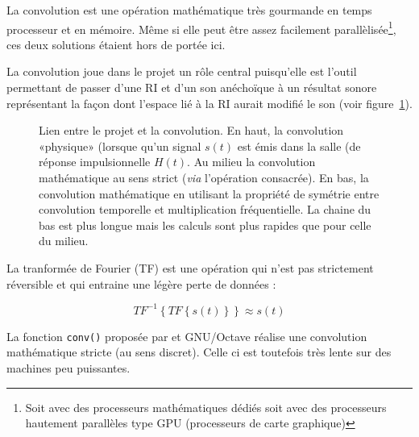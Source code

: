 La convolution est une opération mathématique très gourmande en temps processeur et en mémoire. Même si elle peut être
assez facilement parallèlisée\footnote{Soit avec des processeurs mathématiques dédiés soit avec des processeurs
hautement parallèles type GPU (processeurs de carte graphique)}, ces deux solutions étaient hors de portée ici.

La convolution joue dans le projet un rôle central puisqu'elle est l'outil permettant de passer d'une RI et d'un son
anéchoïque à un résultat sonore représentant la façon dont l'espace lié à la RI aurait modifié le son (voir
figure~\ref{lien_convo_projet}).

\begin{figure}[h!]
\caption{\label{lien_convo_projet}Lien entre le projet et la convolution. En haut, la convolution «physique» (lorsque
qu'un signal $s(t)$ est émis dans la salle (de réponse impulsionnelle $H(t)$. Au milieu la convolution mathématique au
sens strict (\textit{via} l'opération consacrée). En bas, la convolution mathématique en utilisant la propriété de
symétrie entre convolution temporelle et multiplication fréquentielle. La chaine du bas est plus longue mais les calculs
sont plus rapides que pour celle du milieu.}
\end{figure}

La tranformée de Fourier (TF) est une opération qui n'est pas strictement réversible et qui entraine une légère perte de
données :

$$TF^{-1}\left\{TF\left\{s(t)\right\}\right\} \approx s(t)$$

La fonction \texttt{conv()} proposée par \matlab et GNU/Octave réalise une convolution mathématique stricte (au sens
discret). Celle ci est toutefois très lente sur des machines peu puissantes.

